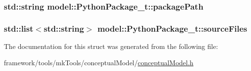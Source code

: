\subsubsection[{\texorpdfstring{package\+Path}{packagePath}}]{\setlength{\rightskip}{0pt plus 5cm}std\+::string model\+::\+Python\+Package\+\_\+t\+::package\+Path}\hypertarget{structmodel_1_1_python_package__t_a5e45a39bcd939f591d8fb71086c36d0b}{}\label{structmodel_1_1_python_package__t_a5e45a39bcd939f591d8fb71086c36d0b}
\subsubsection[{\texorpdfstring{source\+Files}{sourceFiles}}]{\setlength{\rightskip}{0pt plus 5cm}std\+::list$<$std\+::string$>$ model\+::\+Python\+Package\+\_\+t\+::source\+Files}\hypertarget{structmodel_1_1_python_package__t_a1a87a73fa3269cdd454654f1d3a07cd0}{}\label{structmodel_1_1_python_package__t_a1a87a73fa3269cdd454654f1d3a07cd0}


The documentation for this struct was generated from the following file\+:\begin{DoxyCompactItemize}
\item 
framework/tools/mk\+Tools/conceptual\+Model/\hyperlink{conceptual_model_8h}{conceptual\+Model.\+h}\end{DoxyCompactItemize}
